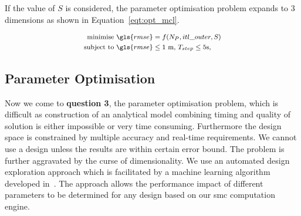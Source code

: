 If the value of $S$ is considered, the parameter optimisation problem expands to 3 dimensions as shown in Equation~\ref{eqt:opt_mcl}.

\begin{equation}
\footnotesize
\begin{aligned}
\mbox{minimise } \gls{rmse} &= f(N_P, itl\_outer, S) \\
\mbox{subject to } \gls{rmse} & \leq \mbox{1 m, } T_{step} \leq \mbox{5s, } \\
\end{aligned}
\label{eqt:opt_mcl}
\end{equation}



\subsection{Parameter Optimisation}
\label{sec:dse}

Now we come to \textbf{question 3}, the parameter optimisation problem, which is difficult as construction of an analytical model combining timing and quality of solution is either impossible or very time consuming. 
Furthermore the design space is constrained by multiple accuracy and real-time requirements.
We cannot use a design unless the results are within certain error bound.
The problem is further aggravated by the curse of dimensionality.
We use an automated design exploration approach which is facilitated by a machine learning algorithm developed in~\cite{kurek14}.
The approach allows the performance impact of different parameters to be determined for any design based on our \gls{smc} computation engine. 

